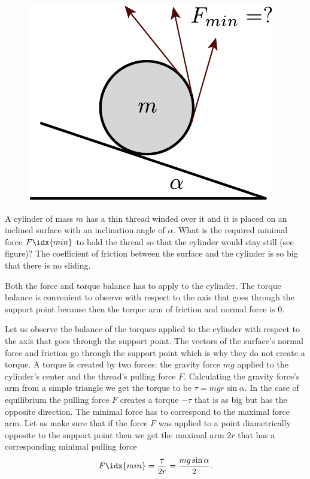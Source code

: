 {\ifEngStatement
\begin{figure}
\vspace{-15pt}
\includegraphics[width=\linewidth]{2013-lahg-08-joonis_niidirull-crop}
\end{figure}
A cylinder of mass $m$ has a thin thread winded over it and it is placed on an inclined surface with an inclination angle of $\alpha$. What is the required minimal force $F\idx{min}$ to hold the thread so that the cylinder would stay still (see figure)? The coefficient of friction between the surface and the cylinder is so big that there is no sliding.
\fi


\ifEngHint
Both the force and torque balance has to apply to the cylinder. The torque balance is convenient to observe with respect to the axis that goes through the support point because then the torque arm of friction and normal force is 0.
\fi


\ifEngSolution
Let us observe the balance of the torques applied to the cylinder with respect to the axis that goes through the support point. The vectors of the surface’s normal force and friction go through the support point which is why they do not create a torque. A torque is created by two forces: the gravity force $mg$ applied to the cylinder’s center and the thread’s pulling force $F$. Calculating the gravity force’s arm from a simple triangle we get the torque to be $\tau=mgr\sin\alpha$. In the case of equilibrium the pulling force $F$ creates a torque $-\tau$ that is as big but has the opposite direction. The minimal force has to correspond to the maximal force arm. Let us make sure that if the force $F$ was applied to a point diametrically opposite to the support point then we get the maximal arm $2r$ that has a corresponding minimal pulling force
\[F\idx{min}=\frac{\tau}{2r}=\frac{mg\sin\alpha}{2}.\]
\fi
}